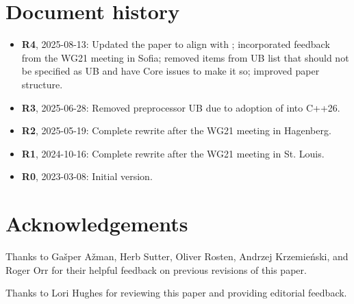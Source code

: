 \section*{Document history}
\begin{itemize}
\item \textbf{R4}, 2025-08-13: Updated the paper to align with \cite{P3754R0}; incorporated feedback from the WG21 meeting in Sofia; removed items from UB list that should not be specified as UB and have Core issues to make it so; improved paper structure.
\item \textbf{R3}, 2025-06-28: Removed preprocessor UB due to adoption of \cite{P2843R3} into C++26.
\item \textbf{R2}, 2025-05-19: Complete rewrite after the WG21 meeting in Hagenberg.
\item \textbf{R1}, 2024-10-16: Complete rewrite after the WG21 meeting in St. Louis.
\item \textbf{R0}, 2023-03-08: Initial version.
\end{itemize}

\section*{Acknowledgements}

Thanks to Ga\v{s}per A\v{z}man, Herb Sutter, Oliver Rosten, Andrzej Krzemie{\'n}ski, and Roger Orr for their helpful feedback on previous revisions of this paper.

Thanks to Lori Hughes for reviewing this paper and providing editorial feedback. 


\renewcommand{\addcontentsline}[3]{}%








